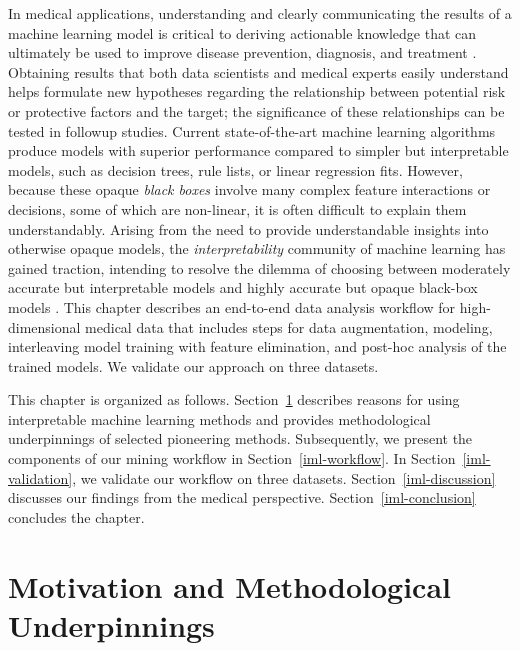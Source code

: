 \documentclass[
  oneside]{book}
\begin{document}
In medical applications, understanding and clearly communicating the results of a machine learning model is critical to deriving actionable knowledge that can ultimately be used to improve disease prevention, diagnosis, and treatment \autocite{tonekaboni2019clinicians}.
Obtaining results that both data scientists and medical experts easily understand helps formulate new hypotheses regarding the relationship between potential risk or protective factors and the target; the significance of these relationships can be tested in followup studies.
Current state-of-the-art machine learning algorithms produce models with superior performance compared to simpler but interpretable models, such as decision trees, rule lists, or linear regression fits.
However, because these opaque \emph{black boxes} involve many complex feature interactions or decisions, some of which are non-linear, it is often difficult to explain them understandably.
Arising from the need to provide understandable insights into otherwise opaque models, the \emph{interpretability} community of machine learning has gained traction, intending to resolve the dilemma of choosing between moderately accurate but interpretable models and highly accurate but opaque black-box models \autocite{molnar2020interpretable,adadi2018peeking,carvalho2019machine}.
This chapter describes an end-to-end data analysis workflow for high-dimensional medical data that includes steps for data augmentation, modeling, interleaving model training with feature elimination, and post-hoc analysis of the trained models.
We validate our approach on three datasets.

This chapter is organized as follows.
Section~\ref{iml-motivation} describes reasons for using interpretable machine learning methods and provides methodological underpinnings of selected pioneering methods.
Subsequently, we present the components of our mining workflow in Section~\ref{iml-workflow}.
In Section~\ref{iml-validation}, we validate our workflow on three datasets.
Section~\ref{iml-discussion} discusses our findings from the medical perspective.
Section~\ref{iml-conclusion} concludes the chapter.

\hypertarget{iml-motivation}{%
\section{Motivation and Methodological Underpinnings}\label{iml-motivation}}
\end{document}
